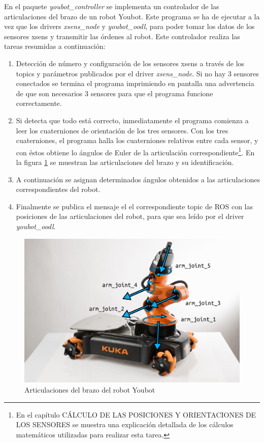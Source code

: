 \documentclass[12pt, a4paper]{report}
\begin{document}
En el paquete \textit{youbot\_controller} se implementa un controlador de las articulaciones del brazo de un robot Youbot. Este programa se ha de ejecutar a la vez que los drivers \textit{xsens\_node} y \textit{youbot\_oodl}, para poder tomar los datos de los sensores xsens y transmitir las órdenes al robot. Este controlador realiza las tareas resumidas a continuación:

\begin{enumerate}

\item Detección de número y configuración de los sensores xsens a través de los topics y parámetros publicados por el driver \textit{xsens\_node}. Si no hay 3 sensores conectados se termina el programa imprimiendo en pantalla una advertencia de que son necesarios 3 sensores para que el programa funcione correctamente.

\item Si detecta que todo está correcto, inmediatamente el programa comienza a leer los cuaterniones de orientación de los tres sensores. Con los tres cuaterniones, el programa halla los cuaterniones relativos entre cada sensor, y con éstos obtiene lo ángulos de Euler de la articulación correspondiente\footnote{En el capítulo CÁLCULO DE LAS POSICIONES Y ORIENTACIONES DE LOS SENSORES se muestra una explicación detallada de los cálculos matemáticos utilizadas para realizar esta tarea.}. En la figura \ref{fig: youbot_joints} se muestran las articulaciones del brazo y su identificación. 

\item A continuación se asignan determinados ángulos obtenidos a las articulaciones correspondientes del robot. 

\item Finalmente se publica el mensaje el el correspondiente topic de ROS con las posiciones de las articulaciones del robot, para que sea leído por el driver \textit{youbot\_oodl}.

\end{enumerate}

\begin{figure}[h]
	\centering
		\includegraphics[scale=0.3]{../img/youbot_joints.png} 
	\caption[Articulaciones del brazo robot Youbot]{Articulaciones del brazo del robot Youbot} 
	\label{fig: youbot_joints}
\end{figure}
\end{document}
